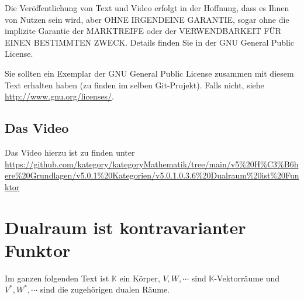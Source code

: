 \documentclass[a4paper]{amsart}
\theoremstyle{definition}
\newcommand{\K}{\ensuremath{\mathbb{ K }}}
\begin{document}
Die Veröffentlichung von Text und Video erfolgt in der Hoffnung, dass es Ihnen von Nutzen sein wird, 
aber OHNE IRGENDEINE GARANTIE, sogar ohne die implizite Garantie der MARKTREIFE oder der 
VERWENDBARKEIT FÜR EINEN BESTIMMTEN ZWECK. Details finden Sie in der GNU General Public License.

Sie sollten ein Exemplar der GNU General Public License zusammen mit diesem Text erhalten haben 
(zu finden im selben Git-Projekt). 
Falls nicht, siehe \url{http://www.gnu.org/licenses/}.

\subsection*{Das Video}
Das Video hierzu ist zu finden unter 
{\tiny
   \url{https://github.com/kategory/kategoryMathematik/tree/main/v5%20H%C3%B6here%20Grundlagen/v5.0.1%20Kategorien/v5.0.1.0.3.6%20Dualraum%20ist%20Funktor}
}

\section{Dualraum ist kontravarianter Funktor}
Im ganzen folgenden Text ist $\K$ ein Körper, $V,W, \cdots$ sind $\K$-Vektorräume und $V^*,W^*, \cdots$ sind die zugehörigen dualen Räume.

\end{document}
